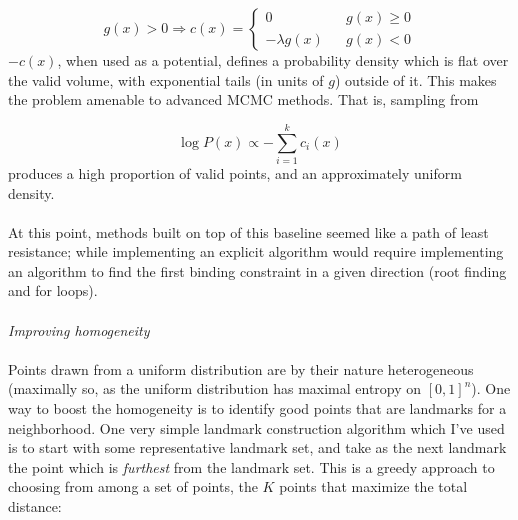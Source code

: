 \documentclass{article}
\begin{document}
$$g(x) > 0 \Rightarrow c(x) = \left\{\begin{array}{ccc} 0 & & g(x) \geq 0 \\ -\lambda g(x) & & g(x) < 0\end{array}\right.$$
$-c(x)$, when used as a potential, defines a probability density which is flat over the valid volume, with exponential tails (in units of $g$) outside of it. This makes the problem amenable to advanced MCMC methods. That is, sampling from

$$\log P(x) \propto -\sum_{i=1}^k c_i(x)$$
produces a high proportion of valid points, and an approximately uniform density. \\ \\
At this point, methods built on top of this baseline seemed like a path of least resistance; while implementing an explicit algorithm would require implementing an algorithm to find the first binding constraint in a given direction (root finding and for loops). \\ \\
\textit{Improving homogeneity} \\ \\
Points drawn from a uniform distribution are by their nature heterogeneous (maximally so, as the uniform distribution has maximal entropy on $[0,1]^n$). One way to boost the homogeneity is to identify good points that are landmarks for a neighborhood. One very simple landmark construction algorithm which I've used is to start with some representative landmark set, and take as the next landmark the point which is \textit{furthest} from the landmark set. This is a greedy approach to choosing from among a set of points, the $K$ points that maximize the total distance:
\end{document}
